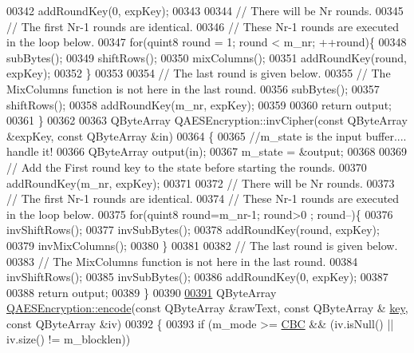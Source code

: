 \begin{DoxyCode}
00342   addRoundKey(0, expKey);
00343 
00344   \textcolor{comment}{// There will be Nr rounds.}
00345   \textcolor{comment}{// The first Nr-1 rounds are identical.}
00346   \textcolor{comment}{// These Nr-1 rounds are executed in the loop below.}
00347   \textcolor{keywordflow}{for}(quint8 round = 1; round < m\_nr; ++round)\{
00348     subBytes();
00349     shiftRows();
00350     mixColumns();
00351     addRoundKey(round, expKey);
00352   \}
00353 
00354   \textcolor{comment}{// The last round is given below.}
00355   \textcolor{comment}{// The MixColumns function is not here in the last round.}
00356   subBytes();
00357   shiftRows();
00358   addRoundKey(m\_nr, expKey);
00359 
00360   \textcolor{keywordflow}{return} output;
00361 \}
00362 
00363 QByteArray QAESEncryption::invCipher(\textcolor{keyword}{const} QByteArray &expKey, \textcolor{keyword}{const} QByteArray &in)
00364 \{
00365     \textcolor{comment}{//m\_state is the input buffer.... handle it!}
00366     QByteArray output(in);
00367     m\_state = &output;
00368 
00369     \textcolor{comment}{// Add the First round key to the state before starting the rounds.}
00370     addRoundKey(m\_nr, expKey);
00371 
00372     \textcolor{comment}{// There will be Nr rounds.}
00373     \textcolor{comment}{// The first Nr-1 rounds are identical.}
00374     \textcolor{comment}{// These Nr-1 rounds are executed in the loop below.}
00375     \textcolor{keywordflow}{for}(quint8 round=m\_nr-1; round>0 ; round--)\{
00376         invShiftRows();
00377         invSubBytes();
00378         addRoundKey(round, expKey);
00379         invMixColumns();
00380     \}
00381 
00382     \textcolor{comment}{// The last round is given below.}
00383     \textcolor{comment}{// The MixColumns function is not here in the last round.}
00384     invShiftRows();
00385     invSubBytes();
00386     addRoundKey(0, expKey);
00387 
00388     \textcolor{keywordflow}{return} output;
00389 \}
00390 
\hypertarget{qaesencryption_8cpp_source.tex_l00391}{}\hyperlink{class_q_a_e_s_encryption_a0c56eddd6f03e93b1f7faad464044d65}{00391} QByteArray \hyperlink{class_q_a_e_s_encryption_a0c56eddd6f03e93b1f7faad464044d65}{QAESEncryption::encode}(\textcolor{keyword}{const} QByteArray &rawText, \textcolor{keyword}{const} QByteArray &
      \hyperlink{namespace_errors_dict_setup_a09c268098d09ffb8e5504f30fa6d5dd9}{key}, \textcolor{keyword}{const} QByteArray &iv)
00392 \{
00393     \textcolor{keywordflow}{if} (m\_mode >= \hyperlink{class_q_a_e_s_encryption_ad3e031c49a3d56566379d75b40b7b255a559bffc55d3599d0a172cc85aed98966}{CBC} && (iv.isNull() || iv.size() != m\_blocklen))

\end{DoxyCode}
